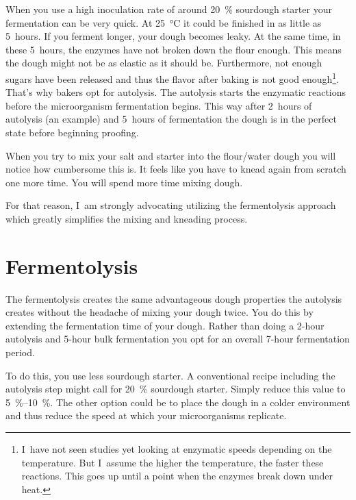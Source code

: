 When you use a high inoculation rate of around \qty{20}{\percent} sourdough starter
your fermentation can be very quick. At \qty{25}{\degreeCelsius} it could be finished in as little as 5~hours.
If you ferment longer, your dough becomes leaky. At the same time, in
these 5~hours, the enzymes have not broken down the flour enough. This means
the dough might not be as elastic as it should be. Furthermore, not enough
sugars have been released and thus the flavor after baking is not good
enough\footnote{I~have not seen studies yet looking at enzymatic speeds depending on
the temperature. But I~assume the higher the temperature, the faster these
reactions. This goes up until a point when the enzymes break down under
heat.}. That's why bakers opt for autolysis. The autolysis starts the enzymatic
reactions before the microorganism fermentation begins. This way after 2~hours
of autolysis (an example) and 5~hours of fermentation the dough is in the
perfect state before beginning proofing.

When you try to mix your salt and starter into the flour/water dough you will
notice how cumbersome this is. It feels like you have to knead again from scratch
one more time. You will spend more time mixing dough.

For that reason, I~am strongly advocating utilizing the fermentolysis approach
which greatly simplifies the mixing and kneading process.

\section{Fermentolysis}%
\label{sec:fermentolysis}

The fermentolysis creates the same advantageous dough properties the
autolysis creates without the headache of mixing your dough twice. You do this
by extending the fermentation time of your dough. Rather than doing a 2-hour
autolysis and 5-hour bulk fermentation you opt for an overall 7-hour
fermentation period.

To do this, you use less sourdough starter. A conventional recipe including the
autolysis step might call for \qty{20}{\percent} sourdough starter. Simply reduce this
value to \qtyrange{5}{10}{\percent}. The other option could be to place the dough in a colder
environment and thus reduce the speed at which your microorganisms replicate.

\begin{table}[!htb]
    \centering
        
        \caption[Quantity of sourdough]{A table visualizing how much sourdough
            starter to use depending on temperature and the starter's activity
            level.}
\end{table}

